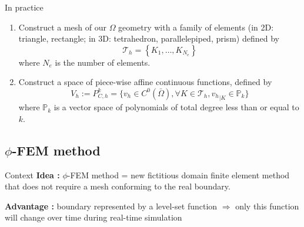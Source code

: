 \documentclass[compress,10pt,xcolor={table,dvipsnames},t]{beamer}
\begin{document}
	\begin{frame}{In practice}
		\begin{enumerate}[\ding{217}]
			\item \begin{minipage}[t]{0.68\linewidth}
				Construct a mesh of our $\Omega$ geometry with a family of elements (in 2D: triangle, rectangle; in 3D: tetrahedron, parallelepiped, prism) defined by
				$$\mathcal{T}_h = \left\{K_1,\dots,K_{N_e}\right\}$$
				where $N_e$ is the number of elements. \\
			\end{minipage} \begin{minipage}[t][][b]{0.28\linewidth}
				\centering
				\qquad {}
			\end{minipage}
			\item Construct a space of piece-wise affine continuous functions, defined by
			\begin{equation*}
				V_h:=P_{C,h}^k=\{v_h\in C^0(\bar{\Omega}), \forall K\in\mathcal{T}_h, {v_h}_{|K}\in\mathbb{P}_k\}
			\end{equation*}
			where $\mathbb{P}_k$ is a vector space of polynomials of total degree less than or equal to $k$.
		\end{enumerate}
		
	\end{frame}

	\subsection{$\phi$-FEM method}
	
	\begin{frame}{Context}
		\textbf{Idea :} $\phi$-FEM method = new fictitious domain finite element method that does not require a mesh conforming to the real boundary.
		\begin{center}
		\end{center}
		\textbf{Advantage :} boundary represented by a level-set function $\Rightarrow$ only this function will change over time during real-time simulation
	\end{frame}
	
\end{document}
